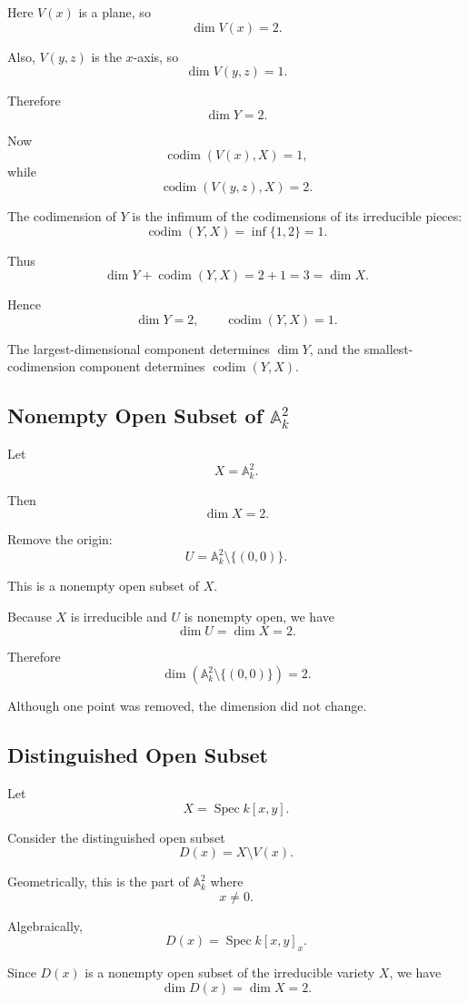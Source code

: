 \documentclass[12pt,a4paper]{article}
\theoremstyle{notespace}
\begin{document}
Here \(V(x)\) is a plane, so
\[
\dim V(x)=2.
\]

Also, \(V(y,z)\) is the \(x\)-axis, so
\[
\dim V(y,z)=1.
\]

Therefore
\[
\dim Y=2.
\]

Now
\[
\operatorname{codim}(V(x),X)=1,
\]
while
\[
\operatorname{codim}(V(y,z),X)=2.
\]

The codimension of \(Y\) is the infimum of the codimensions of its irreducible pieces:
\[
\operatorname{codim}(Y,X)=\inf\{1,2\}=1.
\]

Thus
\[
\dim Y+\operatorname{codim}(Y,X)
=
2+1
=
3
=
\dim X.
\]

Hence
\[
\boxed{\dim Y=2,\qquad \operatorname{codim}(Y,X)=1.}
\]

The largest-dimensional component determines \(\dim Y\), and the smallest-codimension component determines \(\operatorname{codim}(Y,X)\).

\subsection{Nonempty Open Subset of \(\mathbb A^2_k\)}

Let
\[
X=\mathbb A^2_k.
\]

Then
\[
\dim X=2.
\]

Remove the origin:
\[
U=\mathbb A^2_k\setminus \{(0,0)\}.
\]

This is a nonempty open subset of \(X\).

Because \(X\) is irreducible and \(U\) is nonempty open, we have
\[
\dim U=\dim X=2.
\]

Therefore
\[
\boxed{\dim(\mathbb A^2_k\setminus\{(0,0)\})=2.}
\]

Although one point was removed, the dimension did not change.

\subsection{Distinguished Open Subset}

Let
\[
X=\operatorname{Spec} k[x,y].
\]

Consider the distinguished open subset
\[
D(x)=X\setminus V(x).
\]

Geometrically, this is the part of \(\mathbb A^2_k\) where
\[
x\neq 0.
\]

Algebraically,
\[
D(x)=\operatorname{Spec} k[x,y]_x.
\]

Since \(D(x)\) is a nonempty open subset of the irreducible variety \(X\), we have
\[
\dim D(x)=\dim X=2.
\]
\end{document}
